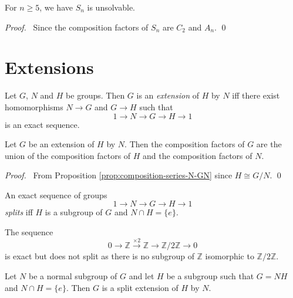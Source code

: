 \begin{cor}
For $n \geq 5$, we have $S_n$ is unsolvable.
\end{cor}

\begin{proof}
\pf\ Since the composition factors of $S_n$ are $C_2$ and $A_n$. \qed
\end{proof}

\chapter{Extensions}

\begin{df}[Extension]
Let $G$, $N$ and $H$ be groups. Then $G$ is an \emph{extension} of $H$ by $N$ iff there exist homomorphisms $N \rightarrow G$ and $G \rightarrow H$ such that
\[ 1 \rightarrow N \rightarrow G \rightarrow H \rightarrow 1 \]
is an exact sequence.
\end{df}

\begin{prop}
Let $G$ be an extension of $H$ by $N$. Then the composition factors of $G$ are the union of the composition factors of $H$ and the composition factors of $N$.
\end{prop}

\begin{proof}
\pf\ From Proposition \ref{prop:composition-series-N-GN} since $H \cong G / N$. \qed
\end{proof}

\begin{df}
An exact sequence of groups
\[ 1 \rightarrow N \rightarrow G \rightarrow H \rightarrow 1 \]
\emph{splits} iff $H$ is a subgroup of $G$ and $N \cap H = \{e\}$.
\end{df}

\begin{ex}
The sequence
\[ 0 \rightarrow \mathbb{Z} \stackrel{\times 2}{\rightarrow} \mathbb{Z} \rightarrow \mathbb{Z} / 2 \mathbb{Z} \rightarrow 0 \]
is exact but does not split as there is no subgroup of $\mathbb{Z}$ isomorphic to $\mathbb{Z} / 2 \mathbb{Z}$.
\end{ex}

\begin{prop}
Let $N$ be a normal subgroup of $G$ and let $H$ be a subgroup such that $G = NH$ and $N \cap H = \{e\}$. Then $G$ is a split extension of $H$ by $N$.
\end{prop}

